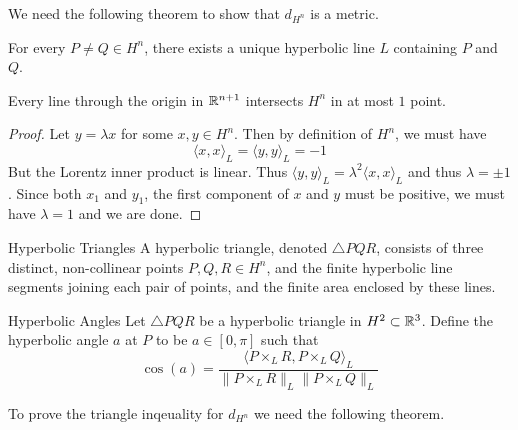 \documentclass[a4paper]{article}
\begin{document}
We need the following theorem to show that $d_{H^n}$ is a metric. 

\begin{lmm}{}{} For every $P\neq Q\in H^n$, there exists a unique hyperbolic line $L$ containing $P$ and $Q$. 
\end{lmm}

\begin{lmm}{}{} Every line through the origin in $\mathbb{R}^{n+1}$ intersects $H^n$ in at most $1$ point. \tcbline
\begin{proof}
Let $y=\lambda x$ for some $x,y\in H^n$. Then by definition of $H^n$, we must have $$\langle x,x\rangle_L=\langle y,y\rangle_L=-1$$ But the Lorentz inner product is linear. Thus $\langle y,y\rangle_L=\lambda^2\langle x,x\rangle_L$ and thus $\lambda=\pm1$. Since both $x_1$ and $y_1$, the first component of $x$ and $y$ must be positive, we must have $\lambda=1$ and we are done. 
\end{proof}
\end{lmm}

\begin{defn}{Hyperbolic Triangles}{} A hyperbolic triangle, denoted $\triangle PQR$, consists of three distinct, non-collinear points $P,Q,R\in H^n$, and the finite hyperbolic line segments joining each pair of points, and the finite area enclosed by these lines. 
\end{defn}

\begin{defn}{Hyperbolic Angles}{} Let $\triangle PQR$ be a hyperbolic triangle in $H^2\subset\mathbb{R}^3$. Define the hyperbolic angle $a$ at $P$ to be $a\in[0,\pi]$ such that $$\cos(a)=\frac{\langle P\times_LR,P\times_LQ\rangle_L}{\|P\times_LR\|_L\|P\times_LQ\|_L}$$
\end{defn}

To prove the triangle inqeuality for $d_{H^n}$ we need the following theorem. 
\end{document}

